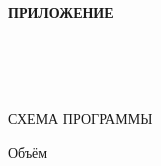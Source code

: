 \begin{ESKDtitlePage}
  \begin{flushright}
    \textbf{ПРИЛОЖЕНИЕ~\envPracticePrilLetter} \enspace\enspace
  \end{flushright}

  \begin{center}
    \envPracticeEducation\\
    \envPracticeUniversity\\
    \envPracticeFaculty\\
    \envPracticeCathedra
  \end{center}

  \vfill

  \begin{center}
    СХЕМА ПРОГРАММЫ
  \end{center}

  \vfill

  \begin{center}
    Объём~\envPracticeDiskSize \\
  \end{center}

  \vfill

  

  \vfill

  \begin{center}
    \envPracticeCity~\ESKDtheYear
  \end{center}
\end{ESKDtitlePage}
